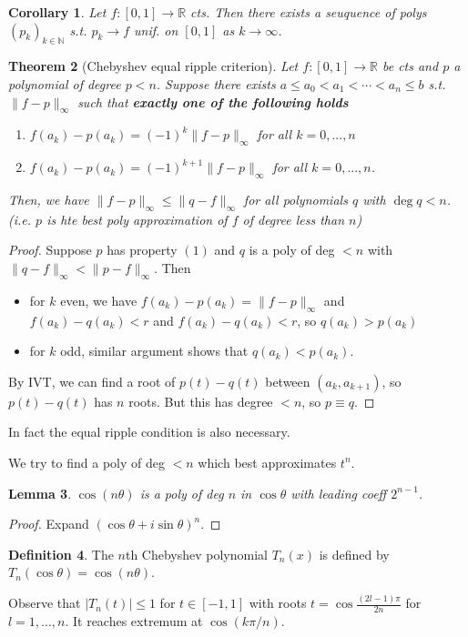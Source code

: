 \documentclass{article}
\theoremstyle{definition}
\newtheorem{defn}{Definition}[section]
\theoremstyle{remark}
\theoremstyle{plain}
\newtheorem{lem}[defn]{Lemma}
\newtheorem{thm}[defn]{Theorem}
\newtheorem{crly}[defn]{Corollary}
\newcommand{\NN}{\mathbb{N}}
\newcommand{\RR}{\mathbb{R}}
\begin{document}
\begin{crly}
    Let $f:[0,1]\to\RR$ cts. Then there exists a seuquence of polys $(p_k)_{k\in\NN}$ s.t. $p_k\to f$ unif. on $[0,1]$ as $k\to\infty$.
\end{crly}
\begin{thm}[Chebyshev equal ripple criterion]
    Let $f:[0,1]\to\RR$ be cts and $p$ a polynomial of degree $p<n$. Suppose there exists $a\le a_0<a_1<\cdots<a_n\le b$ s.t. $\|f-p\|_\infty$ such that \textbf{exactly one of the following holds}\begin{enumerate}[(1)]
        \item $f(a_k)-p(a_k)=(-1)^k\|f-p\|_\infty$ for all $k=0,...,n$
        \item $f(a_k)-p(a_k)=(-1)^{k+1}\|f-p\|_\infty$ for all $k=0,...,n$.
    \end{enumerate}
    Then, we have $\|f-p\|_\infty\le\|q-f\|_\infty$ for all polynomials $q$ with $\deg q<n$. (i.e. $p$ is hte best poly approximation of $f$ of degree less than $n$)
\end{thm}
\begin{proof}
    Suppose $p$ has property $(1)$ and $q$ is a poly of deg $<n$ with $\|q-f\|_\infty<\|p-f\|_\infty$. Then
    \begin{itemize}
        \item for $k$ even, we have $f(a_k)-p(a_k)=\|f-p\|_\infty$ and $f(a_k)-q(a_k)<r$ and $f(a_k)-q(a_k)<r$, so $q(a_k)>p(a_k)$
        \item for $k$ odd, similar argument shows that $q(a_k)<p(a_k)$.
    \end{itemize}
    By IVT, we can find a root of $p(t)-q(t)$ between $(a_k,a_{k+1})$, so $p(t)-q(t)$ has $n$ roots. But this has degree $<n$, so $p\equiv q$.    
\end{proof}
In fact the equal ripple condition is also necessary.

We try to find a poly of deg $<n$ which best approximates $t^n$.
\begin{lem}
    $\cos(n\theta)$ is a poly of deg $n$ in $\cos\theta$ with leading coeff $2^{n-1}$.
\end{lem}
\begin{proof}
    Expand $(\cos\theta+i\sin\theta)^n$.
\end{proof}
\begin{defn}
    The $n$th Chebyshev polynomial $T_n(x)$ is defined by $T_n(\cos\theta)=\cos(n\theta)$.
\end{defn}
Observe that $|T_n(t)|\le 1$ for $t\in[-1,1]$ with roots $t=\cos\frac{(2l-1)\pi}{2n}$ for $l=1,...,n$. It reaches extremum at $\cos(k\pi/n)$.
\end{document}

